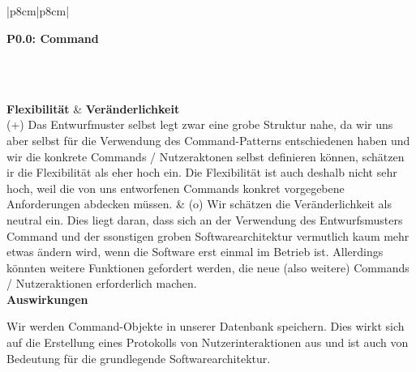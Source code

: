 \documentclass[enabledeprecatedfontcommands,fontsize=11pt,paper=a4,twoside]{scrartcl}
\newcounter{one}
\newcounter{two}[one]
\newcommand{\tone}{0\theone}
\newcommand{\two}{\stepcounter{two}0\thetwo}
\begin{document}
\\ \\ \\ \\%
\begin{tabular} {|p{8cm}|p{8cm}|}
	\hline
	 {\parbox{16cm}{\textbf{\hypertarget{i}{P\tone.\two}: Command }} } \\ \hline\hline 
	\rule{0pt}{13ex}\\ [3ex] \hline
	\textbf{Flexibilität}  & \textbf{Veränderlichkeit} \\
	(+) Das Entwurfmuster selbst legt zwar eine grobe Struktur nahe, da wir uns aber selbst für die Verwendung des Command-Patterns entschiedenen haben und wir die konkrete Commands / Nutzeraktonen selbst definieren können, schätzen ir die Flexibilität als eher hoch ein. Die Flexibilität ist auch deshalb nicht sehr hoch, weil die von uns entworfenen Commands konkret vorgegebene Anforderungen abdecken müssen. & 
	(o) Wir schätzen die Veränderlichkeit als neutral ein. Dies liegt daran, dass sich an der Verwendung des Entwurfsmusters Command und der ssonstigen groben Softwarearchitektur vermutlich kaum mehr etwas ändern wird, wenn die Software erst einmal im Betrieb ist. Allerdings könnten weitere Funktionen gefordert werden, die neue (also weitere) Commands / Nutzeraktionen erforderlich machen.\\
	\hline
	 {\textbf{Auswirkungen}} \\
	 {\parbox{16cm}{Wir werden Command-Objekte in unserer Datenbank speichern. Dies wirkt sich auf die Erstellung eines Protokolls von Nutzerinteraktionen aus und ist auch von Bedeutung für die grundlegende Softwarearchitektur.}}\\ [3ex]\hline
\end{tabular}
\end{document}

